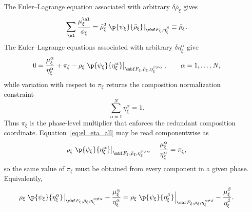 The Euler--Lagrange equation associated with arbitrary $\delta\bar\rho_\xi$ gives
\begin{equation}
  \sum_\al \frac{\mu_{\xi}^\al}{\phi_{\xi}}
  = \bar\rho^2_{\xi}\left.\p{\psi_{\xi}}{\bar\rho_{\xi}}\right\vert_{\mbf F_\xi,\eta_\xi^\beta}
  \equiv \bar{p}_{\xi} .
  \label{eq:phase_pressure_all}
\end{equation}
The Euler--Lagrange equations associated with arbitrary $\delta\eta_{\xi}^\alpha$ give
\begin{equation}
  0 = \frac{\mu_{\xi}^\alpha}{\eta_{\xi}^\alpha} + \pi_{\xi}
  - \rho_{\xi}\left.\p{\psi_{\xi}}{\eta_{\xi}^\alpha}\right\vert_{\mbf F_\xi,\bar\rho_{\xi},\eta_{\xi}^{\beta\neq\alpha}},
  \qquad \alpha=1,\ldots,N,
  \label{eq:el_eta_all}
\end{equation}
while variation with respect to $\pi_{\xi}$ returns the composition normalization
constraint
\begin{equation}
  \sum_{\alpha=1}^N \eta_{\xi}^\alpha = 1.
  \label{eq:el_eta_constraint}
\end{equation}
Thus $\pi_{\xi}$ is the phase-level multiplier that enforces the redundant
composition coordinate.  Equation~\eqref{eq:el_eta_all} may be read
componentwise as
\begin{equation}
  \rho_{\xi}\left.\p{\psi_{\xi}}{\eta_{\xi}^\alpha}\right\vert_{\mbf F_\xi,\bar\rho_{\xi},\eta_{\xi}^{\beta\neq\alpha}}
  - \frac{\mu_{\xi}^\alpha}{\eta_{\xi}^\alpha}
  = \pi_{\xi},
  \label{eq:pi_componentwise}
\end{equation}
so the same value of $\pi_{\xi}$ must be obtained from every component in a
given phase.  Equivalently,
\begin{equation}
  \rho_{\xi}\left.\p{\psi_{\xi}}{\eta_{\xi}^\alpha}\right\vert_{\mbf F_\xi,\bar\rho_{\xi},\eta_{\xi}^{\kappa\neq\alpha}}
  - \frac{\mu_{\xi}^\alpha}{\eta_{\xi}^\alpha}
  = \rho_{\xi}\left.\p{\psi_{\xi}}{\eta_{\xi}^\beta}\right\vert_{\mbf F_\xi,\bar\rho_{\xi},\eta_{\xi}^{\kappa\neq\beta}}
  - \frac{\mu_{\xi}^\beta}{\eta_{\xi}^\beta}.
  \label{eq:pi_difference}
\end{equation}

